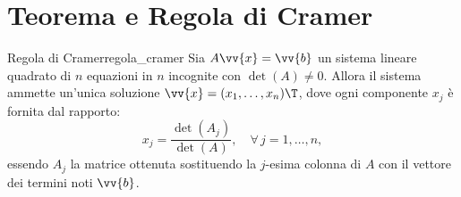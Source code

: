 \section{Teorema e Regola di Cramer}

\begin{teorema}{Regola di Cramer}{regola_cramer}
Sia $A \vv{x} = \vv{b}$ un sistema lineare quadrato di $n$ equazioni in $n$ incognite con $\det(A) \neq 0$. Allora il sistema ammette un'unica soluzione $\vv{x} = (x_1, \dots, x_n)\T$, dove ogni componente $x_j$ è fornita dal rapporto:
\begin{equation}
    x_j = \frac{\det(A_j)}{\det(A)}, \quad \forall\, j = 1, \dots, n,
\end{equation}
essendo $A_j$ la matrice ottenuta sostituendo la $j$-esima colonna di $A$ con il vettore dei termini noti $\vv{b}$.
\end{teorema}
